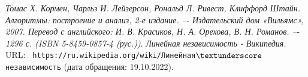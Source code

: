 \begin{thebibliography}{99}
{\itshape Томас Х. Кормен, Чарльз И. Лейзерсон, Рональд Л. Ривест, Клиффорд Штайн.
Алгоритмы: построение и анализ, 2-е издание. –- Издательский дом
«Вильямс», 2007. Перевод с английского: И. В. Красиков, Н. А. Орехова,
В. Н. Романов. –- 1296 с. (ISBN 5-8459-0857-4 (рус.))}.
{\itshape Линейная независимость - Википедия.} \\URL: \texttt{
https://ru.wikipedia.org/wiki/Линейная$\textunderscore$независимость} (дата обращения: 19.10.2022).
\end{thebibliography}
\pagebreak


